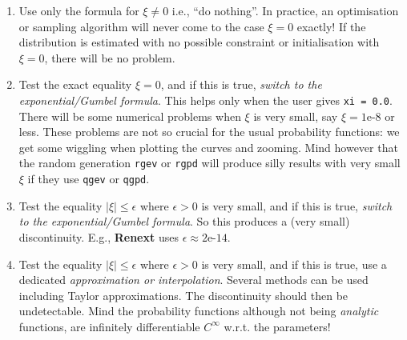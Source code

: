 \documentclass[11pt]{article}\usepackage[]{graphicx}\usepackage[]{xcolor}
\newcommand{\pkg}[1]{\textbf{#1}}
\newcommand{\code}[1]{\texttt{#1}}
\begin{document}
\begin{enumerate}

\item  {} Use only the formula for $\xi \neq 0$ i.e., {``do nothing''}.
  In practice, an optimisation or sampling algorithm will never come
  to the case $\xi = 0$ exactly!  If the distribution is estimated
  with no possible constraint or initialisation with $\xi = 0$, there
  will be no problem.
  
\item {} Test the exact equality $\xi = 0$, and if this is true,
  \textit{switch to the exponential/Gumbel formula}.  This helps only
  when the user gives \code{xi = 0.0}. There will be some numerical
  problems when $\xi$ is very small, say $\xi = \text{1e-8}$ or
  less. These problems are not so crucial for the usual probability
  functions: we get some wiggling when plotting the curves and
  zooming. Mind however that the random generation \code{rgev} or
  \code{rgpd} will produce silly results with very small $\xi$ if they
  use \code{qgev} or \code{qgpd}.

\item  {}  Test the equality $ |\xi| \leqslant \epsilon$ where
  $\epsilon >0$ is very small, and if this is true, \textit{switch
    to the exponential/Gumbel formula}. So this produces a (very
  small) discontinuity.  E.g., \pkg{Renext} uses
  $\epsilon \approx \text{2e-14}$.
  
  
\item {} Test the equality
  $ |\xi| \leqslant \epsilon$ where $\epsilon >0$ is very small, and
  if this is true, use a dedicated \textit{approximation or
    interpolation}.  Several methods can be used including Taylor
  approximations. The discontinuity should then be undetectable.  Mind
  the probability functions although not being \textit{analytic}
  functions, are infinitely differentiable $C^\infty$ w.r.t. the
  parameters!
  
\end{enumerate}
\end{document}
